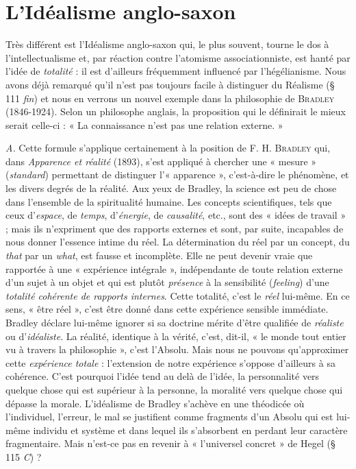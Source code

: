 \section{L’Idéalisme anglo-saxon}%
Très différent est l’Idéalisme
anglo-saxon qui, le plus souvent, tourne le dos à l’intellectualisme
et, par réaction contre l’atomisme associationniste, est hanté par
l'idée de {\it totalité} : il est d’ailleurs fréquemment influencé par l’hégélianisme.
Nous avons déjà remarqué qu’il n’est pas toujours facile à
distinguer du Réalisme (§ 111 {\it fin}) et nous en verrons un nouvel
exemple dans la philosophie de \textsc{Bradley} (1846-1924). Selon un philosophe
anglais, la proposition qui le définirait le mieux serait celle-ci :
« La connaissance n’est pas une relation externe. »

{\it A.} Cette formule s'applique certainement à la position de F. H. \textsc{Bradley}
qui, dans {\it Apparence et réalité} (1893), s'est appliqué à chercher une « mesure »
({\it standard}) permettant de distinguer l’« apparence », c’est-à-dire le phénomène,
et les divers degrés de la réalité. Aux yeux de Bradley, la science est
peu de chose dans l’ensemble de la spiritualité humaine. Les concepts
scientifiques, tels que ceux d’{\it espace}, de {\it temps}, d'{\it énergie}, de {\it causalité}, etc.,
sont des « idées de travail » ; mais ils n’expriment que des rapports externes
et sont, par suite, incapables de nous donner l'essence intime du réel. La
détermination du réel par un concept, du {\it that} par un {\it what}, est fausse et
incomplète. Elle ne peut devenir vraie que rapportée à une « expérience
intégrale », indépendante de toute relation externe d’un sujet à un objet
et qui est plutôt {\it présence} à la sensibilité ({\it feeling}) d’une \textsf{\textit {totalité cohérente
de rapports internes}}. Cette totalité, c’est le {\it réel} lui-même. En ce sens, « être
réel », c'est être donné dans cette expérience sensible immédiate. Bradley
déclare lui-même ignorer si sa doctrine mérite d’être qualifiée de {\it réaliste}
ou d’{\it idéaliste}. La réalité, identique à la vérité, c’est, dit-il, « le monde tout
entier vu à travers la philosophie », c’est l’Absolu. Mais nous ne pouvons
qu'approximer cette {\it expérience totale} : l'extension de notre expérience
s’oppose d’ailleurs à sa cohérence. C’est pourquoi l’idée tend au delà de
l'idée, la personnalité vers quelque chose qui est supérieur à la personne,
la moralité vers quelque chose qui dépasse la morale. L'idéalisme de
Bradley s'achève en une théodicée où l’individuel, l'erreur, le mal se justifient
comme fragments d’un Absolu qui est lui-même individu et système et
dans lequel ils s’absorbent en perdant leur caractère fragmentaire. Mais
n'est-ce pas en revenir à « l’universel concret » de Hegel (§ 115 {\it C}) ?

